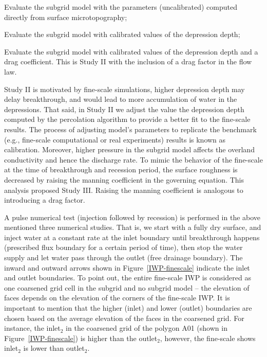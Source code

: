 \documentclass[review,11pt]{elsarticle}
\begin{document}
\begin{description}\itemsep0pt \parskip0pt
\item [Study I:] Evaluate the subgrid model with the parameters (uncalibrated) computed directly from surface microtopography;
\item [Study II:] Evaluate the subgrid model with calibrated values of the depression depth;%
\item [Study III:] Evaluate the subgrid model with calibrated values of the depression depth and a drag coefficient. This is Study II with the inclusion of a drag factor in the flow law.
\end{description}

Study II is motivated by fine-scale simulations, higher depression depth may delay breakthrough, and would lead to more accumulation of water in the depressions. That said, in Study II we adjust the value the depression depth computed by the percolation algorithm to provide a better fit to the fine-scale results. The process of adjusting model's parameters to replicate the benchmark (e.g., fine-scale computational or real experiments) results is known as calibration. Moreover, higher pressure in the subgrid model affects the overland conductivity and hence the discharge rate. To mimic the behavior of the fine-scale at the time of breakthrough and recession period, the surface roughness is decreased by raising the manning coefficient in the governing equation. This analysis proposed Study III. Raising the manning coefficient is analogous to introducing a drag factor.

A pulse numerical test (injection followed by recession) is performed in the above mentioned three numerical studies. That is, we start with a fully dry surface, and inject water at a constant rate at the inlet boundary until breakthrough happens (prescribed flux boundary for a certain period of time), then stop the water supply and let water pass through the outlet (free drainage boundary). The inward and outward arrows shown in Figure~\ref{IWP-finescale} indicate the inlet and outlet boundaries. 
To point out, the entire fine-scale IWP is considered as one coarsened grid cell in the subgrid and no subgrid model -- the elevation of faces depends on the elevation of the corners of the fine-scale IWP.  It is important to mention that the higher (inlet) and lower (outlet) boundaries are chosen based on the average elevation of the faces in the coarsened grid. For instance, the inlet$_2$ in the coarsened grid of the polygon A01 (shown in Figure~\ref{IWP-finescale}) is higher than the outlet$_2$, however, the fine-scale shows inlet$_2$ is lower than outlet$_2$. 
\end{document}
